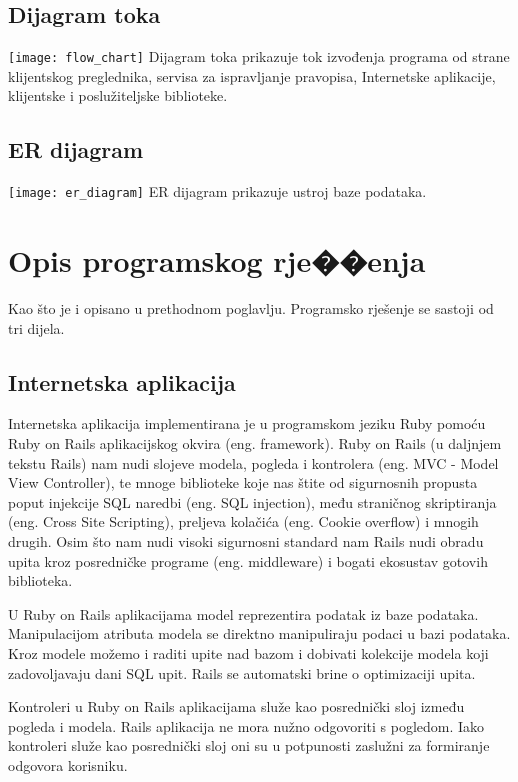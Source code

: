 \documentclass[times, utf8, zavrsni]{fer}
\begin{document}
\section{Dijagram toka}
\texttt{[image: flow\_chart]}
Dijagram toka prikazuje tok izvođenja programa od strane klijentskog
preglednika, servisa za ispravljanje pravopisa, Internetske aplikacije,
klijentske i poslužiteljske biblioteke.

\section{ER dijagram}
\texttt{[image: er\_diagram]}
ER dijagram prikazuje ustroj baze podataka.

\chapter{Opis programskog rje��enja}
Kao što je i opisano u prethodnom poglavlju. Programsko rješenje se sastoji od
tri dijela.

\section{Internetska aplikacija}
Internetska aplikacija implementirana je u programskom jeziku Ruby pomoću Ruby
on Rails aplikacijskog okvira (eng. framework). Ruby on Rails (u daljnjem tekstu
Rails) nam nudi slojeve modela, pogleda i kontrolera (eng. MVC - Model View
Controller), te mnoge biblioteke koje nas štite od sigurnosnih propusta poput
injekcije SQL naredbi (eng. SQL injection), među straničnog skriptiranja (eng.
Cross Site Scripting), preljeva kolačića (eng. Cookie overflow) i mnogih drugih.
Osim što nam nudi visoki sigurnosni standard nam Rails nudi obradu upita kroz
posredničke programe (eng. middleware) i bogati ekosustav gotovih biblioteka.

U Ruby on Rails aplikacijama model reprezentira podatak iz baze podataka.
Manipulacijom atributa modela se direktno manipuliraju podaci u bazi podataka.
Kroz modele možemo i raditi upite nad bazom i dobivati kolekcije modela koji
zadovoljavaju dani SQL upit. Rails se automatski brine o optimizaciji upita.

Kontroleri u Ruby on Rails aplikacijama služe kao posrednički sloj između
pogleda i modela. Rails aplikacija ne mora nužno odgovoriti s pogledom. Iako
kontroleri služe kao posrednički sloj oni su u potpunosti zaslužni za formiranje
odgovora korisniku.
\end{document}
